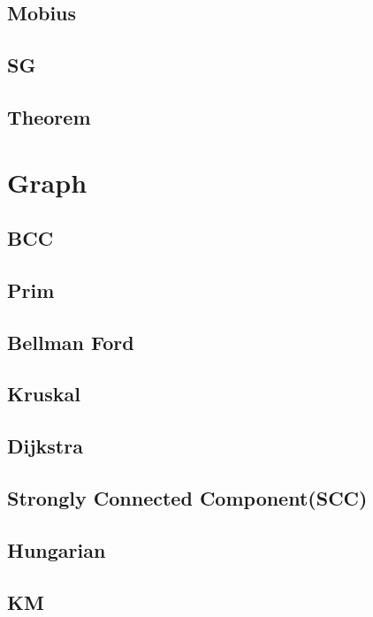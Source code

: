 \subsection{Mobius}

\subsection{SG}

\subsection{Theorem}



\section{Graph}

\subsection{BCC}

\subsection{Prim}

\subsection{Bellman Ford}

\subsection{Kruskal}

\subsection{Dijkstra}

\subsection{Strongly Connected Component(SCC)}

\subsection{Hungarian}

\subsection{KM}

